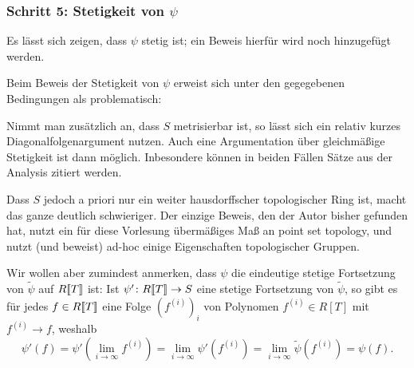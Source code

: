 \documentclass[a4paper, 10pt, numbers=noenddot]{scrartcl}
\begin{document}
\subsubsection*{Schritt 5: Stetigkeit von $\psi$}
Es lässt sich zeigen, dass $\psi$ stetig ist;
ein Beweis hierfür wird noch hinzugefügt werden.


\begin{remark}
  Beim Beweis der Stetigkeit von $\psi$ erweist sich unter den gegegebenen Bedingungen als problematisch:
  
  Nimmt man zusätzlich an, dass $S$ metrisierbar ist, so lässt sich ein relativ kurzes Diagonalfolgenargument nutzen.
  Auch eine Argumentation über gleichmäßige Stetigkeit ist dann möglich.
  Inbesondere können in beiden Fällen Sätze aus der Analysis zitiert werden.
  
  Dass $S$ jedoch a priori nur ein weiter hausdorffscher topologischer Ring ist, macht das ganze deutlich schwieriger.
  Der einzige Beweis, den der Autor bisher gefunden hat, nutzt ein für diese Vorlesung übermäßiges Maß an point set topology, und nutzt (und beweist) ad-hoc einige Eigenschaften topologischer Gruppen.
\end{remark}

Wir wollen aber zumindest anmerken, dass $\psi$ die eindeutige stetige Fortsetzung von $\tilde{\psi}$ auf $R[\![T]\!]$ ist:
Ist $\psi' \colon R[\![T]\!] \to S$ eine stetige Fortsetzung von $\tilde{\psi}$, so gibt es für jedes $f \in R[\![T]\!]$ eine Folge $(f^{(i)})_i$ von Polynomen $f^{(i)} \in R[T]$ mit $f^{(i)} \to f$, weshalb
\[
    \psi'(f)
  = \psi'\left( \lim_{i \to \infty} f^{(i)} \right)
  = \lim_{i \to \infty} \psi'\left( f^{(i)} \right)
  = \lim_{i \to \infty} \tilde{\psi}\left( f^{(i)} \right)
  = \psi(f).
\]
\end{document}
